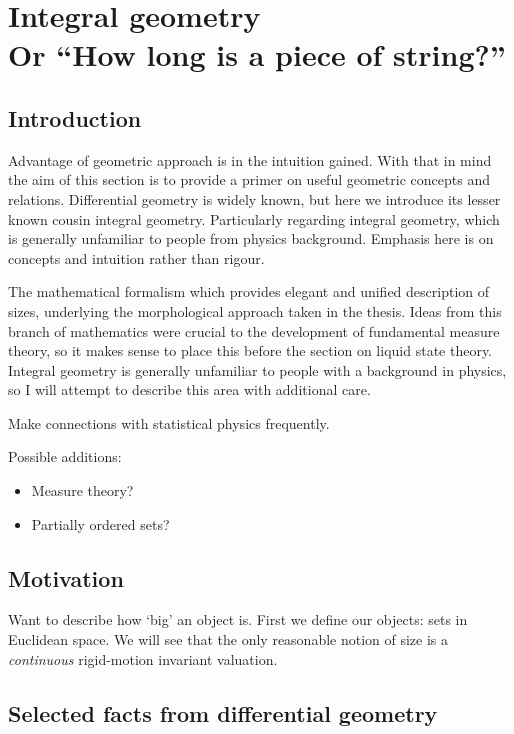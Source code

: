 \section[Integral geometry. Or ``How long is a piece of string?'']{Integral geometry\\ {\large Or ``How long is a piece of string?''}}
\label{sec:integral-geometry}

\subsection{Introduction}

Advantage of geometric approach is in the intuition gained.
With that in mind the aim of this section is to provide a primer on useful geometric concepts and relations.
Differential geometry is widely known, but here we introduce its lesser known cousin integral geometry.
Particularly regarding integral geometry, which is generally unfamiliar to people from physics background.
Emphasis here is on concepts and intuition rather than rigour.

The mathematical formalism which provides elegant and unified description of sizes, underlying the morphological approach taken in the thesis.
Ideas from this branch of mathematics were crucial to the development of fundamental measure theory, so it makes sense to place this before the section on liquid state theory.
Integral geometry is generally unfamiliar to people with a background in physics, so I will attempt to describe this area with additional care.

Make connections with statistical physics frequently.

Possible additions:
\begin{itemize}
\item Measure theory?
\item Partially ordered sets?
\end{itemize}

\subsection{Motivation}

Want to describe how `big' an object is.
First we define our objects: sets in Euclidean space.
We will see that the only reasonable notion of size is a \emph{continuous} rigid-motion invariant valuation.

\subsection{Selected facts from differential geometry}

